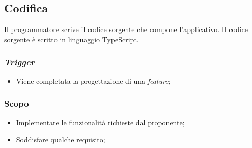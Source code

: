 \subsection{Codifica}
\label{codifica}

Il programmatore scrive il codice sorgente che compone l'applicativo. Il codice
sorgente è scritto in linguaggio TypeScript.

\subsubsection{\textit{Trigger}}
\begin{itemize}
	\item Viene completata la progettazione di una \textit{feature};
\end{itemize}

\subsubsection{Scopo}
\begin{itemize}
	\item Implementare le funzionalità richieste dal proponente;

	\item Soddisfare qualche requisito;
\end{itemize}

